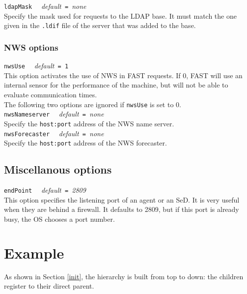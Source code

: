 \noindent
\texttt{ldapMask} \ \ \emph{default}\texttt{ = }\emph{none}\\
Specify the mask used for requests to the LDAP base. It must match the one given
in the \texttt{.ldif} file of the server that was added to the base.


\subsubsection{NWS options}

\noindent
\texttt{nwsUse} \ \ \emph{default}\texttt{ = 1}\\
This option activates the use of NWS in FAST requests. If 0, FAST will use an
internal sensor for the performance of the machine, but will not be able to
evaluate communication times.
\\

The following two options are ignored if \texttt{nwsUse} is set to 0.
\\

\noindent
\texttt{nwsNameserver} \ \ \emph{default}\texttt{ = }\emph{none}\\
Specify the \texttt{host:port} address of the NWS name server.
\\

\noindent
\texttt{nwsForecaster} \ \ \emph{default}\texttt{ = }\emph{none}\\
Specify the \texttt{host:port} address of the NWS forecaster.
\\


\subsection{Miscellanous options}

\texttt{endPoint} \ \ \emph{default}\texttt{ = }\emph{2809}\\
This option specifies the listening port of an agent or an SeD. It is very
useful when they are behind a firewall. It defaults to 2809, but if this port is
already busy, the OS chooses a port number.



\section{Example}
\label{sec:deploy_ex}

As shown in Section \ref{init}, the hierarchy is built from top to down: the
children register to their direct parent.

